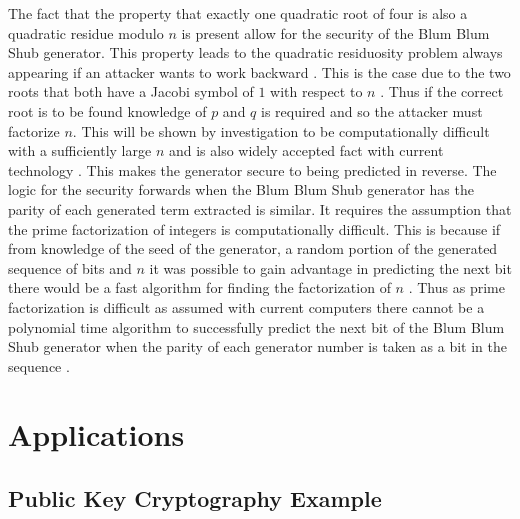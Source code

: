 \documentclass{article}
\begin{document}
The fact that the property that exactly one quadratic root of four is also a quadratic residue modulo $n$ is present allow for the security of the Blum Blum Shub generator. This property leads to the quadratic residuosity problem always appearing if an attacker wants to work backward \cite{Blum1986}. This is the case due to the two roots that both have a Jacobi symbol of $1$ with respect to $n$ \cite{Fischer2017}. Thus if the correct root is to be found knowledge of $p$ and $q$ is required and so the attacker must factorize $n$. This will be shown by investigation to be computationally difficult with a sufficiently large $n$ and is also widely accepted fact with current technology \cite{Landquist2001} \cite{Blum1986}. This makes the generator secure to being predicted in reverse. The logic for the security forwards when the Blum Blum Shub generator has the parity of each generated term extracted is similar. It requires the assumption that the prime factorization of integers is computationally difficult. This is because if from knowledge of the seed of the generator, a random portion of the generated sequence of bits and $n$ it was possible to gain advantage in predicting the next bit there would be a fast algorithm for finding the factorization of $n$ \cite{Blum1986} \cite{Faisal2017}. Thus as prime factorization is difficult as assumed with current computers there cannot be a polynomial time algorithm to successfully predict the next bit of the Blum Blum Shub generator when the parity of each generator number is taken as a bit in the sequence \cite{Blum1986} \cite{Faisal2017}.

\section{Applications}

\subsection{Public Key Cryptography Example}
\end{document}
